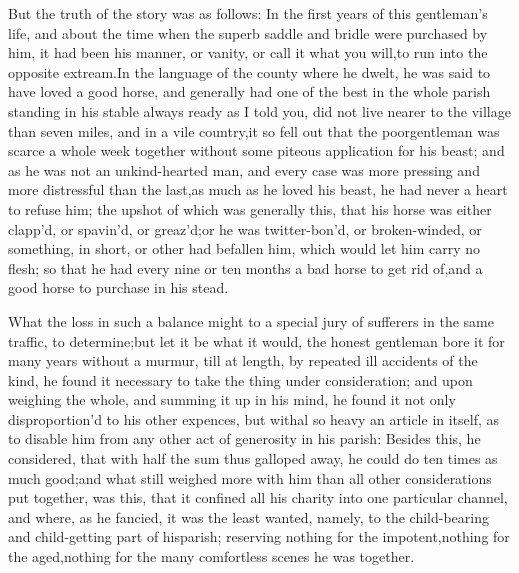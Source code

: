 \documentclass{article}
\begin{document}
But the truth of the story was as follows: In the first years of
this gentleman’s life, and about the time when the superb saddle
and bridle were purchased by him, it had been his manner, or
vanity, or call it what you will,\tsk  to run into the opposite
extream.\tsk  In the language of the county where he dwelt, he
was said to have loved a good horse, and generally had one of
the best in the whole parish standing in his stable always ready
\break
as I told you, did not
live nearer to the village than seven miles, and in a vile
country,\tsh  it so fell out that the poor\break gentleman was scarce
a whole week together without some piteous application for his
beast; and as he was not an un\-kind-hearted man, and every case
was more pressing and more distressful than the last,\tsk  as
much as he loved his beast, he had never a heart to refuse
him; the upshot of which was generally this, that his horse was
either clapp’d, or spavin’d, or greaz’d;\tsk  or he was
twitter-bon’d, or broken-winded, or something, in short, or
other had befallen him, which would let him carry no flesh;\tsk
so that he had every nine or ten months a bad horse to get rid
of,\tsk  and a good horse to purchase in his stead.

What the loss in such a balance might  to a special jury of sufferers in the same traffic,
to determine;\tsk  but let it be what it would, the honest
gentleman bore it for many years without a murmur, till at
length, by repeated ill accidents of the kind, he found it
necessary to take the thing under consideration; and upon
weighing the whole, and summing it up in his mind, he
found it not only disproportion’d to his other expences, but
withal so heavy an article in itself, as to disable him from any
other act of generosity in his parish: Besides this, he
considered, that with half the sum thus galloped away, he could
do ten times as much good;\tsk  and what still weighed more with
him than all other considerations put together, was this, that
it confined all his charity into one particular channel, and
where, as he fancied, it was the least wanted, namely, to the
child-bearing and child-getting part of his\break parish;
reserving nothing for the impotent,\tsk  nothing for the
aged,\tsk  nothing for the many comfortless scenes he was
\break
together.
\end{document}
